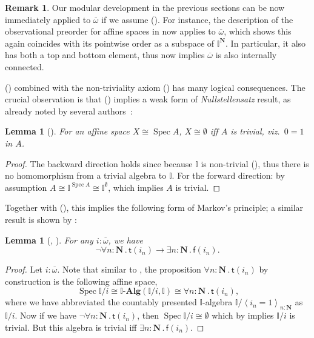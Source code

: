 \documentclass[a4paper,12pt]{amsart}
\newtheorem{lemma}[theorem]{Lemma}
\theoremstyle{definition}
\newtheorem{remark}[theorem]{Remark}
\newcommand{\mb}[1]{\mathbf{#1}}
\newcommand{\mbb}[1]{\mathbb{#1}}
\newcommand{\I}{\mbb I}
\newcommand{\ms}[1]{\mathsf{#1}}
\newcommand{\alg}{\text{-}\mb{Alg}}
\newcommand{\ov}[1]{\overline{#1}}
\newcommand{\pair}[1]{\left\langle#1\right\rangle}
\newcommand{\N}{\mb N}
\newcommand{\fa}[2]{\forall #1\!\colon\!\!#2\mathpunct{.}}
\newcommand{\ex}[2]{\exists #1\!\colon\!\!#2\mathpunct{.}}
\newcommand{\emp}{\emptyset}
\newcommand{\spec}{\operatorname{Spec}}
\newcommand\istsym{\ms{t}}
\newcommand\isfsym{\ms{f}}
\newcommand\ist[1]{\istsym(#1)}
\newcommand\isf[1]{\isfsym(#1)}
\begin{document}
\PrintAxiomSQCC

\begin{remark}
  Our modular development in the previous sections can be now immediately applied to $\ov\omega$ if we assume (\AxiomSQCC). For instance, the description of the observational preorder for affine spaces in  now applies to $\ov\omega$, which shows this again coincides with its pointwise order as a subspace of $\I^\N$. In particular, it also has both a top and bottom element, thus  now implies $\ov\omega$ is also internally connected. 
\end{remark}

(\AxiomSQCC) combined with the non-triviality axiom (\AxiomNT) has many logical consequences. The crucial observation is that (\AxiomNT) implies a weak form of \emph{Nullstellensatz} result, as already noted by several authors~\citep{blechschmidt2021using,blechschmidt2020general,Cherubini_Coquand_Hutzler_2024}:

\begin{lemma}[\AxiomNT]\label{lem:nulls}
  For an affine space $X \cong \spec A$, $X \cong \emp$ iff $A$ is trivial, viz.\ $0=1$ in $A$.
\end{lemma}
\begin{proof}
  The backward direction holds since because $\I$ is non-trivial (\AxiomNT), thus there is no homomorphism from a trivial algebra to $\I$. For the forward direction: by assumption $A \cong \I^{\spec A} \cong \I^\emp$, which implies $A$ is trivial. 
\end{proof}

Together with (\AxiomSQCC), this implies the following form of Markov's principle; a similar result is shown by \citet{cherubini2024foundation}:

\begin{lemma}[\AxiomNT, \AxiomSQCC]\label{lem:markov}
  For any $i : \ov\omega$, we have
  \[ \neg\fa{n}{\N}\ist{i_n} \to \ex n\N\isf{i_n}\text{.} \]
\end{lemma}
\begin{proof}
  Let $i : \ov\omega$. Note that similar to , the proposition $\fa n\N \ist{i_n}$ by construction is the following affine space, 
  \[ \spec\I/i \cong \I\alg(\I/i,\I) \cong \fa n\N \ist{i_n}\text{,} \]
  where we have abbreviated the countably presented $\I$-algebra $\I/\pair{i_n=1}_{n:\N}$ as $\I/i$. Now if we have $\neg\fa n\N \ist{i_n}$, then $\spec\I/i \cong \emp$ which by  implies $\I/i$ is trivial. But this algebra is trivial iff $\ex n\N \isf{i_n}$.
\end{proof}
\end{document}
